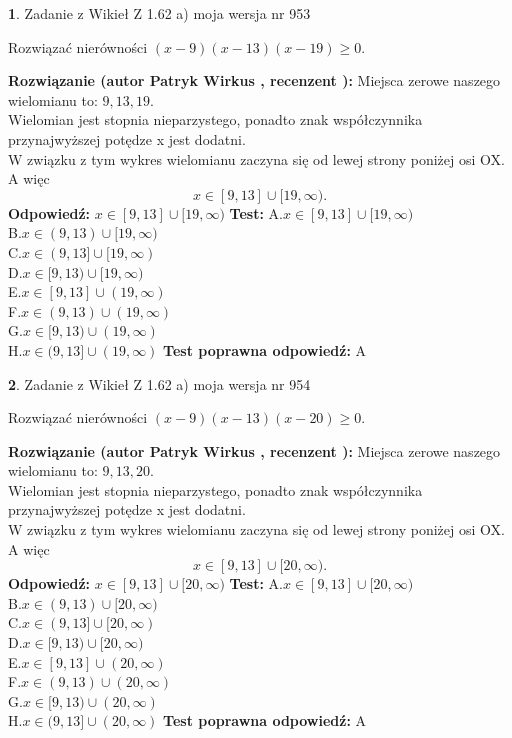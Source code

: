 \documentclass[12pt, a4paper]{article}
\theoremstyle{definition} %
\newtheorem{zad}{}
\newcommand{\zadStart}[1]{\begin{zad}#1\newline}
\newcommand{\zadStop}{\end{zad}}
\newcommand{\rozwStart}[2]{\noindent \textbf{Rozwiązanie (autor #1 , recenzent #2): }\newline}
\newcommand{\rozwStop}{\newline}
\newcommand{\odpStart}{\noindent \textbf{Odpowiedź:}\newline}
\newcommand{\odpStop}{\newline}
\newcommand{\testStart}{\noindent \textbf{Test:}\newline}
\newcommand{\testStop}{\newline}
\newcommand{\kluczStart}{\noindent \textbf{Test poprawna odpowiedź:}\newline}
\newcommand{\kluczStop}{\newline}
\begin{document}
\zadStart{Zadanie z Wikieł Z 1.62 a) moja wersja nr 953}

Rozwiązać nierówności $(x-9)(x-13)(x-19)\ge0$.
\zadStop
\rozwStart{Patryk Wirkus}{}
Miejsca zerowe naszego wielomianu to: $9, 13, 19$.\\
Wielomian jest stopnia nieparzystego, ponadto znak współczynnika przy\linebreak najwyższej potędze x jest dodatni.\\ W związku z tym wykres wielomianu zaczyna się od lewej strony poniżej osi OX. A więc $$x \in [9,13] \cup [19,\infty).$$
\rozwStop
\odpStart
$x \in [9,13] \cup [19,\infty)$
\odpStop
\testStart
A.$x \in [9,13] \cup [19,\infty)$\\
B.$x \in (9,13) \cup [19,\infty)$\\
C.$x \in (9,13] \cup [19,\infty)$\\
D.$x \in [9,13) \cup [19,\infty)$\\
E.$x \in [9,13] \cup (19,\infty)$\\
F.$x \in (9,13) \cup (19,\infty)$\\
G.$x \in [9,13) \cup (19,\infty)$\\
H.$x \in (9,13] \cup (19,\infty)$
\testStop
\kluczStart
A
\kluczStop



\zadStart{Zadanie z Wikieł Z 1.62 a) moja wersja nr 954}

Rozwiązać nierówności $(x-9)(x-13)(x-20)\ge0$.
\zadStop
\rozwStart{Patryk Wirkus}{}
Miejsca zerowe naszego wielomianu to: $9, 13, 20$.\\
Wielomian jest stopnia nieparzystego, ponadto znak współczynnika przy\linebreak najwyższej potędze x jest dodatni.\\ W związku z tym wykres wielomianu zaczyna się od lewej strony poniżej osi OX. A więc $$x \in [9,13] \cup [20,\infty).$$
\rozwStop
\odpStart
$x \in [9,13] \cup [20,\infty)$
\odpStop
\testStart
A.$x \in [9,13] \cup [20,\infty)$\\
B.$x \in (9,13) \cup [20,\infty)$\\
C.$x \in (9,13] \cup [20,\infty)$\\
D.$x \in [9,13) \cup [20,\infty)$\\
E.$x \in [9,13] \cup (20,\infty)$\\
F.$x \in (9,13) \cup (20,\infty)$\\
G.$x \in [9,13) \cup (20,\infty)$\\
H.$x \in (9,13] \cup (20,\infty)$
\testStop
\kluczStart
A
\kluczStop
\end{document}
